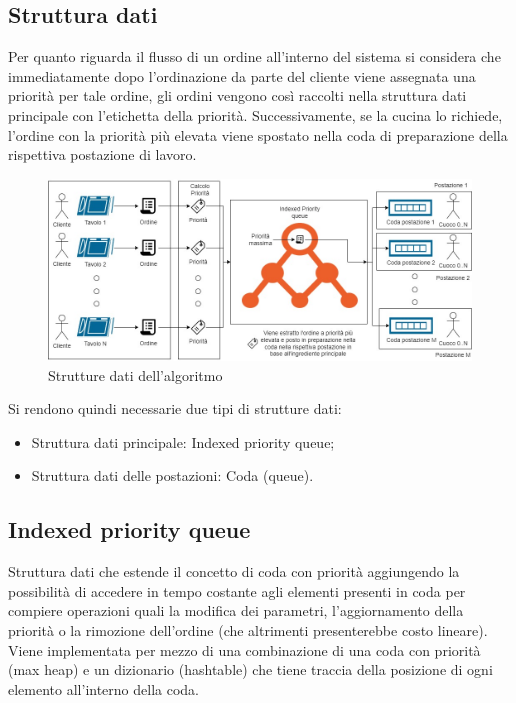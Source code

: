 \subsection{Struttura dati}
Per quanto riguarda il flusso di un ordine all’interno del sistema si considera che immediatamente dopo l’ordinazione da parte del cliente viene assegnata una priorità per tale ordine, gli ordini vengono così raccolti nella struttura dati principale con l’etichetta della priorità. Successivamente, se la cucina lo richiede, l'ordine con la priorità più elevata viene spostato nella coda di preparazione della rispettiva postazione di lavoro.

\begin{figure}[htbp]
	\centering
	\includegraphics[scale=0.4]{iterazione1/images/Algoritmo_struttura.jpg}
	\caption{Strutture dati dell'algoritmo\label{fig:algoritmo_struttura}}
\end{figure}

Si rendono quindi necessarie due tipi di strutture dati:
\begin{itemize}
	\item Struttura dati principale: Indexed priority queue;
	\item Struttura dati delle postazioni: Coda (queue).
\end{itemize}

\subsection*{Indexed priority queue}
Struttura dati che estende il concetto di coda con priorità aggiungendo la possibilità di accedere in tempo costante agli elementi presenti in coda per compiere operazioni quali la modifica dei parametri, l’aggiornamento della priorità o la rimozione dell’ordine (che altrimenti presenterebbe costo lineare).
Viene implementata per mezzo di una combinazione di una coda con priorità (max heap) e un dizionario (hashtable) che tiene traccia della posizione di ogni elemento all'interno della coda.

